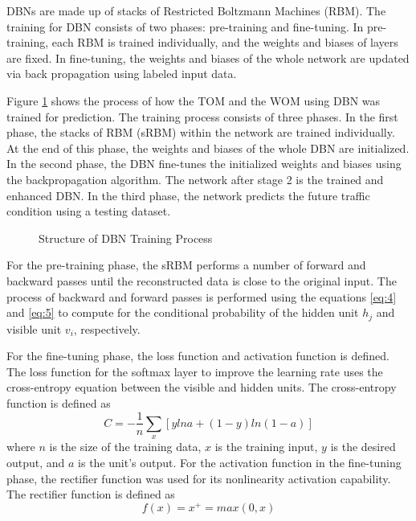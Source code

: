 
DBNs are made up of stacks of Restricted Boltzmann Machines (RBM). The training for DBN consists of two phases: pre-training and fine-tuning. In pre-training, each RBM is trained individually, and the weights and biases of layers are fixed. In fine-tuning, the weights and biases of the whole network are updated via back propagation using labeled input data.

Figure \ref{fig:dbntraining} shows the process of how the TOM and the WOM using DBN was trained for prediction. The training process consists of three phases. In the first phase, the stacks of RBM (sRBM) within the network are trained individually. At the end of this phase, the weights and biases of the whole DBN are initialized. In the second phase, the DBN fine-tunes the initialized weights and biases using the backpropagation algorithm. The network after stage 2 is the trained and enhanced DBN. In the third phase, the network predicts the future traffic condition using a testing dataset.

\begin{figure}[h]
	\centering
	\captionsetup{justification=centering}
	\caption{Structure of DBN Training Process}
	\label{fig:dbntraining}
\end{figure}

For the pre-training phase, the sRBM performs a number of forward and backward passes until the reconstructed data is close to the original input. The process of backward and forward passes is performed using the equations \ref{eq:4} and \ref{eq:5} to compute for the conditional probability of the hidden unit $h_j$ and visible unit $v_i$, respectively.

For the fine-tuning phase, the loss function and activation function is defined.
The loss function for the softmax layer to improve the learning rate uses the cross-entropy equation between the visible and hidden units. The cross-entropy function is defined as
\begin{equation}
C = -\frac{1}{n}\sum_x [y ln a + (1 - y) ln (1-a)]
\end{equation}
\noindent where $n$ is the size of the training data, $x$ is the training input, $y$ is the desired output, and $a$ is the unit’s output.
For the activation function in the fine-tuning phase, the rectifier function was used for its nonlinearity activation capability. The rectifier function is defined as
\begin{equation}
f(x) = x^+ = max(0, x)
\end{equation}


